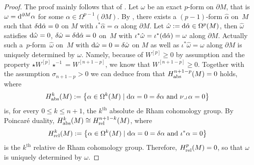 \begin{proof}
The proof mainly follows that of \cite[Theorem 5]{RaulotSavo11}.
Let $\omega$ be an exact $p$-form on $\partial M$, that is $\omega={\rm d}^{\partial M}\alpha$ for some $\alpha\in\Omega^{p-1}(\partial M)$.
By \cite[Theorem 2]{DuffSpencer52}, there exists a $(p-1)$-form $\hat{\alpha}$ on~$M$ such that $\delta {\rm d}\hat{\alpha}=0$ on $M$ with $\iota^*\hat{\alpha}=\alpha$ along $\partial M$. Let $\hat{\omega}:={\rm d}\hat{\alpha}\in\Omega^p(M)$, then $\hat{\omega}$ satisfies ${\rm d}\hat{\omega}=0$, $\delta\hat{\omega}=\delta {\rm d}\hat{\alpha}=0$ on~$M$ with $\iota^*\hat{\omega}=\iota^*({\rm d}\hat{\alpha})=\omega$ along $\partial M$. Actually such a~$p$-form~$\hat{\omega}$ on~$M$ with ${\rm d}\hat{\omega}=0=\delta\hat{\omega}$ on $M$ as well as $\iota^*\hat{\omega}=\omega$ along $\partial M$ is uniquely determined by $\omega$. Namely, because of $W^{[p]}\geq0$ by assumption and the property $\star W^{[p]}\star^{-1}=W^{[n+1-p]}$, we know that $W^{[n+1-p]}\geq0$. Together with the assumption $\sigma_{n+1-p}>0$ we can deduce from \cite[Theorem~4]{RaulotSavo11} that $H_{\rm abs}^{n+1-p}(M)=0$  holds, where
\[H_{\rm abs}^{k}(M) :=\bigl\{\alpha\in\Omega^k(M) \mid {\rm d}\alpha=0=\delta\alpha\textrm{ and }\nu\lrcorner\,\alpha=0\bigr\}\]
is, for every $0\leq k\leq n+1$, the $k^{\textrm{th}}$ absolute de Rham cohomology group. By Poincar\'e duality, $H_{\rm abs}^{k}(M)\cong H_{\rm rel}^{n+1-k}(M)$,  where
\[H_{\rm rel}^{k}(M):=\bigl\{\alpha\in\Omega^k(M) \mid {\rm d}\alpha=0=\delta\alpha\textrm{ and }\iota^*\alpha=0\bigr\}\]
is the $k^{\textrm{th}}$ relative de Rham cohomology group. Therefore, $H_{\rm rel}^{p}(M)=0$, so that $\hat{\omega}$ is uniquely determined by $\omega$.


\end{proof}
